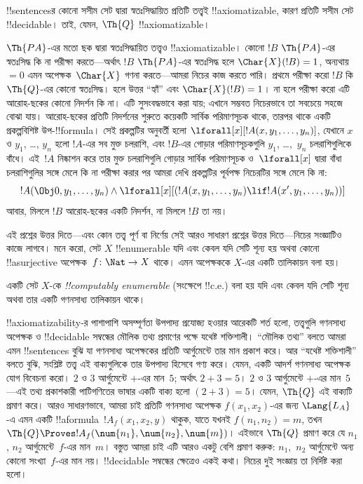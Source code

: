 \documentclass[../../../include/open-logic-section]{subfiles}
\begin{document}
\begin{ex}
!!{sentence}sর কোনো সসীম সেট দ্বারা স্বতঃসিদ্ধায়িত প্রতিটি তত্ত্বই
!!{axiomatizable}, কারণ প্রতিটি সসীম সেট !!{decidable}। তাই, যেমন,
$\Th{Q}$ !!{axiomatizable}।

$\Th{PA}$-এর মতো ছক দ্বারা স্বতঃসিদ্ধায়িত তত্ত্বও !!{axiomatizable}। কোনো
$!B$ $\Th{PA}$-এর স্বতঃসিদ্ধ কি না পরীক্ষা করতে—অর্থাৎ $!B$ $\Th{PA}$-এর
স্বতঃসিদ্ধ হলে $\Char{X}(!B) = 1$, অন্যথায় $= 0$ এমন অপেক্ষক~$\Char{X}$
গণনা করতে—আমরা নিচের কাজ করতে পারি। প্রথমে পরীক্ষা করো $!B$ কি $\Th{Q}$-এর
কোনো স্বতঃসিদ্ধ। হলে উত্তর ``হ্যাঁ'' এবং $\Char{X}(!B) = 1$। না হলে পরীক্ষা
করো এটি আরোহ-ছকের কোনো নিদর্শন কি না। এটি সুসংবদ্ধভাবে করা যায়; এখানে সম্ভবত
নিচেরভাবে তা সবচেয়ে সহজে বোঝা যায়। আরোহ-ছকের প্রতিটি নিদর্শনের শুরুতে কয়েকটি
সার্বিক পরিমাণসূচক থাকে, তারপর থাকে একটি প্রকল্পবিশিষ্ট উপ-!!{formula}। সেই
প্রকল্পটির অনুবর্তী হলো $\lforall[x][!A(x, y_1, \dots, y_n)]$, যেখানে $x$ ও
$y_1$, \dots, $y_n$ হলো $!A$-এর সব মুক্ত চলরাশি, এবং $!B$-এর গোড়ার
পরিমাণসূচকগুলি $y_1$, \dots,~$y_n$ চলরাশিগুলিকে বাঁধে। এই~$!A$ নিষ্কাশন করে
তার মুক্ত চলরাশিগুলি গোড়ার সার্বিক পরিমাণসূচক ও~$\lforall[x]$ দ্বারা বাঁধা
চলরাশিগুলির সঙ্গে মেলে কি না পরীক্ষা করার পর আমরা দেখি প্রকল্পটির পূর্বপক্ষ
নিচেরটির সঙ্গে মেলে কি না:
\[
!A(\Obj 0, y_1, \dots, y_n) \land \lforall[x][(!A(x, y_1, \dots, y_n)
\lif !A(x', y_1, \dots, y_n))]
\]
আবার, মিললে $!B$ আরোহ-ছকের একটি নিদর্শন, না মিললে $!B$ তা নয়।
\end{ex}

এই প্রশ্নের উত্তর দিতে—এবং কোন তত্ত্ব পূর্ণ বা নির্ণেয় সেই আরও সাধারণ প্রশ্নের
উত্তর দিতে—নিচের সংজ্ঞাটিও কাজে লাগবে। মনে করো, সেট $X$ !!{enumerable} যদি
এবং কেবল যদি সেটি শূন্য হয় অথবা কোনো !!a{surjective} অপেক্ষক~$f \colon \Nat
\to X$ থাকে। এমন অপেক্ষককে $X$-এর একটি তালিকায়ন বলা হয়।

\begin{defn}
একটি সেট $X$-কে \emph{!!{computably enumerable}} (সংক্ষেপে !!{c.e.}) বলা হয়
যদি এবং কেবল যদি সেটি শূন্য অথবা তার একটি গণনসাধ্য তালিকায়ন থাকে।
\end{defn}

!!{axiomatizability}-র পাশাপাশি অসম্পূর্ণতা উপপাদ্য প্রযোজ্য হওয়ার আরেকটি শর্ত
হলো, তত্ত্বগুলি গণনসাধ্য অপেক্ষক ও !!{decidable} সম্বন্ধের মৌলিক তথ্য প্রমাণের
পক্ষে যথেষ্ট শক্তিশালী। ``মৌলিক তথ্য'' বলতে আমরা এমন !!{sentence}s বুঝি যা
গণনসাধ্য অপেক্ষকের প্রতিটি আর্গুমেন্টে তার মান প্রকাশ করে। আর ``যথেষ্ট
শক্তিশালী'' বলতে বুঝি, সংশ্লিষ্ট তত্ত্ব এই বাক্যগুলিকে তার উপপাদ্য হিসেবে গণ্য
করে। যেমন, একটি আদর্শ গণনসাধ্য অপেক্ষক যোগ বিবেচনা করো। $2$ ও $3$ আর্গুমেন্টে
$+$-এর মান~$5$; অর্থাৎ $2+3 = 5$। $2$ ও $3$ আর্গুমেন্টে $+$-এর মান~$5$—এই
তথ্য প্রকাশকারী পাটিগণিতের ভাষার একটি বাক্য হলো
$(\num{2} + \num{3}) = \num{5}$। যেমন, $\Th{Q}$ এই বাক্যটি প্রমাণ করে। আরও
সাধারণভাবে, আমরা চাই প্রতিটি গণনসাধ্য অপেক্ষক $f(x_1, x_2)$-এর জন্য
$\Lang{L_A}$-এ এমন একটি !!a{formula}~$!A_f(x_1, x_2, y)$ থাকুক, যাতে যখনই
$f(n_1, n_2) = m$, তখন $\Th{Q} \Proves !A_f(\num{n_1}, \num{n_2},
\num{m})$। এইভাবে $\Th{Q}$ প্রমাণ করে যে $n_1$, $n_2$ আর্গুমেন্টে~$f$-এর
মান~$m$। বস্তুত আমরা চাই এটি আরও একটু বেশি প্রমাণ করুক: $n_1$,~$n_2$
আর্গুমেন্টে অন্য কোনো সংখ্যা~$f$-এর মান নয়। !!{decidable} সম্বন্ধের ক্ষেত্রেও
একই কথা। নিচের দুই সংজ্ঞায় তা নির্দিষ্ট করা হলো।
\end{document}
